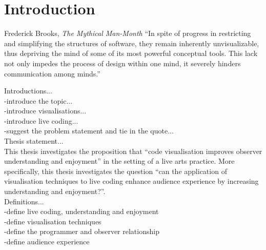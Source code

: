 
\chapter{Introduction}
\label{chap:introduction}

\begin{chapquote}{Frederick Brooks, \textit{The Mythical Man-Month}}
``In spite of progress in restricting and simplifying the structures of software, they remain inherently unvisualizable, thus depriving the mind of some of its most powerful conceptual tools. This lack not only impedes the process of design within one mind, it severely hinders communication among minds.''
\end{chapquote}



Introductions...\\
-introduce the topic...\\
-introduce visualisations...\\
-introduce live coding...\\
-suggest the problem statement and tie in the quote...\\


Thesis statement...\\
This thesis investigates the proposition that ``code visualisation improves observer understanding and enjoyment'' in the setting of a live arts practice. More specifically, this thesis investigates the question ``can the application of visualisation techniques to live coding enhance audience experience by increasing understanding and enjoyment?''.\\

Definitions...\\
-define live coding, understanding and enjoyment\\
-define visualisation techniques\\
-define the programmer and observer relationship\\
-define audience experience\\

